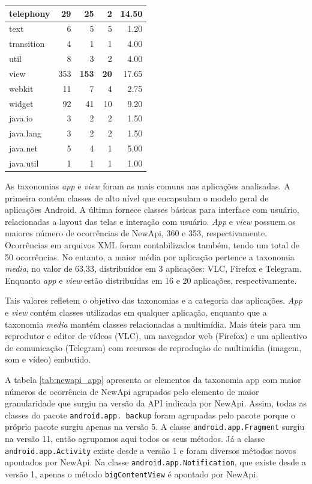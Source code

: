 \begin{table}[!htb]
\begin{tabular}{| l | r | r | r | r |}
 	telephony       & 29 			& 25 			&   2 			& 14.50   \\ \hline
 	text        	& 6 			& 5 			&   5 			& 1.20   \\ \hline
 	transition 	 	& 4 			& 1 			&   1 			& 4.00   \\ \hline
 	util       	 	& 8				& 3 			&   2 			& 4.00   \\ \hline
 	view        	& 353 			& \textbf{153} 	&  \textbf{20} 	& 17.65   \\ \hline
 	webkit        	& 11 			& 7 			&  4 			& 2.75   \\ \hline
 	widget 			& 92			& 41 			&  10 			& 9.20   \\ \hline
 	java.io 		& 3				& 2 			&  2 			& 1.50   \\ \hline
 	java.lang 		& 3				& 2 			&  2 			& 1.50   \\ \hline
 	java.net 		& 5				& 4 			&  1 			& 5.00   \\ \hline
 	java.util 		& 1				& 1 			&  1 			& 1.00   \\ \hline
  \end{tabular}
  \label{tab:elementos_nova_api}
\end{table}

As taxonomias \textit{app} e \textit{view} foram as mais comuns nas aplicações analisadas.
A primeira contém classes de alto nível que encapsulam o modelo geral de aplicações Android.
A última fornece classes básicas para interface com usuário, relacionadas a layout das telas
e interação com usuário. \textit{App} e \textit{view} possuem os maiores número de ocorrências
de NewApi, 360 e 353, respectivamente. Ocorrências em arquivos XML foram contabilizados também,
tendo um total de 50 ocorrências. No entanto, a maior média por aplicação pertence a taxonomia
\textit{media}, no valor de 63,33, distribuídos em 3 aplicações:  VLC, Firefox e Telegram.
Enquanto \textit{app} e \textit{view} estão distribuídas em 16 e 20 aplicações, respectivamente.

Tais valores refletem o objetivo das taxonomias e a categoria das aplicações.
\textit{App} e \textit{view} contém classes utilizadas em qualquer aplicação, enquanto que a
taxonomia \textit{media} mantém classes relacionadas a multimídia. Mais úteis para um reprodutor
e editor de vídeos (VLC), um navegador web (Firefox) e um aplicativo de comunicação (Telegram)
com recursos de reprodução de multimídia (imagem, som e vídeo) embutido.

A tabela \ref{tab:newapi_app} apresenta os elementos da taxonomia app com maior
números de ocorrência de NewApi agrupados pelo elemento de maior granularidade
que surgiu na versão da API indicada por NewApi. Assim, todas as classes do pacote
\texttt{android.app. backup} foram agrupadas pelo pacote porque o próprio pacote
surgiu apenas na versão 5. A classe \texttt{android.app.Fragment} surgiu na versão
11, então agrupamos aqui todos os seus métodos. Já a classe \texttt{android.app.Activity}
existe desde a versão 1 e foram diversos métodos novos apontados por NewApi. Na
classe \texttt{android.app.Notification}, que existe desde a versão 1, apenas o
método \texttt{bigContentView} é apontado por NewApi.

